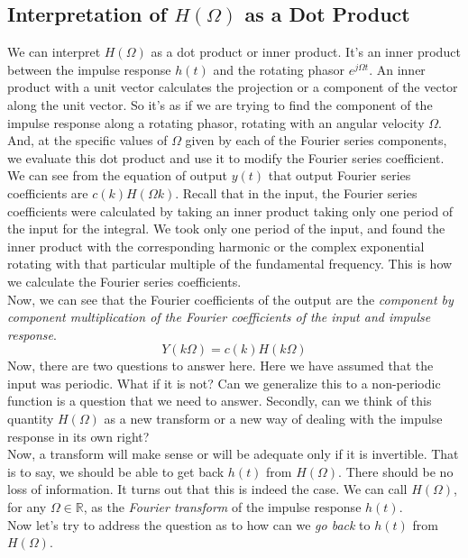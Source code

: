 \subsection{Interpretation of $H(\Omega)$ as a Dot Product}
We can interpret $H(\Omega)$ as a dot product or inner product. It’s an inner product between the impulse response $h(t)$ and the rotating phasor $e^{j\Omega t}$. An inner product with a unit vector calculates the projection or a component of the vector along the unit vector. So it's as if we are trying to find the component of the impulse response along a rotating phasor, rotating with an angular velocity $\Omega$. And, at the specific values of $\Omega$ given by each of the Fourier series components, we evaluate this dot product and use it to modify the Fourier series coefficient.
We can see from the equation of output $y(t)$ that output Fourier series coefficients are $c(k)H(\Omega k)$. Recall that in the input, the Fourier series coefficients were calculated by taking an inner product taking only one period of the input for the integral.
We took only one period of the input, and found the inner product with the corresponding harmonic or the complex exponential rotating with that particular multiple of the fundamental frequency. This is how we calculate the Fourier series coefficients.\\
Now, we can see that the Fourier coefficients of the output are the \emph{component by component multiplication of the Fourier coefficients of the input and impulse response}.
\[
Y(k\Omega)= c(k)H(k\Omega)
\]
Now, there are two questions to answer here. Here we have assumed that the input was periodic. What if it is not? Can we generalize this to a non-periodic function is a question that we need to answer. Secondly, can we think of this quantity $H(\Omega)$ as a new transform or a new way of dealing with the impulse response in its own right?\\
Now, a transform will make sense or will be adequate only if it is invertible. That is to say, we should be able to get back $h(t)$ from $H(\Omega)$. There should be no loss of information. It turns out that this is indeed the case. We can call $H(\Omega)$, for any $\Omega \in \mathbb{R}$, as the \emph{Fourier transform} of the impulse response $h(t)$.\\
Now let's try to address the question as to how can we \emph{go back} to $h(t)$ from $H(\Omega)$.
